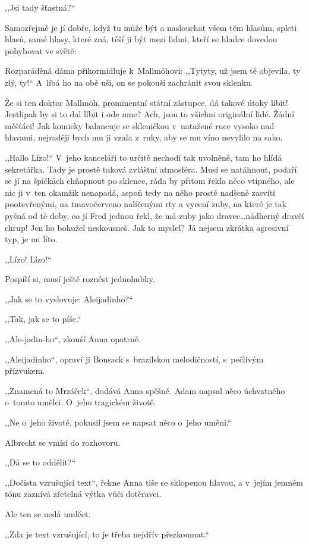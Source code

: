 ,,Jsi tady šťastná?``

Samozřejmě je jí dobře, když tu může být a naslouchat všem těm hlasům, spleti hlasů, samé hlasy, které zná, těší ji být mezi lidmi, kteří se hladce dovedou pohybovat ve světě:

Rozparáděná dáma přikormidluje k~Mallmöhovi: ,,Tytyty, už jsem tě objevila, ty zlý, ty!`` A~líbá ho na obě uši, on se pokouší zachránit svou sklenku.

Že si ten doktor Mallmöh, prominentní státní zástupce, dá takové útoky líbit! Jestlipak by si to dal líbit i ode mne? Ach, jsou to všichni originální lidé. Žádní měšťáci! Jak komicky balancuje se skleničkou v~natažené ruce vysoko nad hlavami, nejraději bych mu ji vzala z~ruky, aby se mu víno nevylilo na sako.

,,Hallo Lízo!`` V~jeho kanceláři to určitě nechodí tak uvolněně, tam ho hlídá sekretářka. Tady je prostě taková zvláštní atmosféra. Musí se natáhnout, podaří se jí na špičkách chňapnout po sklence, ráda by přitom řekla něco vtipného, ale nic ji v~ten okamžik nenapadá, aspoň tedy na něho prostě nadšeně zasvítí pootevřenými, na tmavočerveno nalíčenými rty a vycení zuby, na které je tak pyšná od té doby, co jí Fred jednou řekl, že má zuby jako dravec\ldots nádherný dravčí chrup! Jen ho bohužel neskousneš. Jak to myslel? Já nejsem zkrátka agresivní typ, je mi líto.

,,Lízo! Lízo!``

Pospíší si, musí ještě roznést jednohubky.


,,Jak se to vyslovuje: Aleijadinho?``

,,Tak, jak se to píše.``

,,Ale-jadin-ho``, zkouší Anna opatrně.

,,Aleijadinho``, opraví ji Bonsack s~brazilskou melodičností, s~pečlivým přízvukem.

,,Znamená to Mrzáček``, dodává Anna spěšně. Adam napsal něco úchvatného o~tomto umělci. O~jeho tragickém životě.

,,Ne o~jeho životě, pokusil jsem se napsat něco o~jeho umění.``

Albrecht se vmísí do rozhovoru.

,,Dá se to oddělit?``

,,Dočista vzrušující text``, řekne Anna tiše se sklopenou hlavou, a v~jejím jemném tónu zaznívá zřetelná výtka vůči dotěravci.

Ale ten se nedá umlčet.

,,Zda je text vzrušující, to je třeba nejdřív přezkoumat.``

